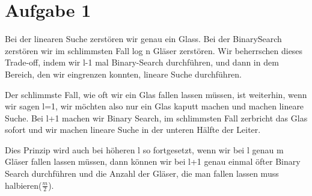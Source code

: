 \documentclass{scrartcl}
\begin{document}
 \section{Aufgabe 1} Bei der linearen Suche 
zerstören wir genau ein Glass. Bei der BinarySearch zerstören wir 
im schlimmsten Fall log n Gläser zerstören. Wir beherrschen dieses 
Trade-off, indem wir l-1 mal Binary-Search durchführen, und dann 
in dem Bereich, den wir eingrenzen konnten, lineare Suche 
durchführen. 

Der schlimmste Fall, wie oft wir ein Glas fallen lassen müssen, 
ist weiterhin, wenn wir sagen l=1, wir möchten also nur ein Glas 
kaputt machen und machen lineare Suche. Bei l+1 machen wir Binary 
Search, im schlimmsten Fall zerbricht das Glas sofort und wir 
machen lineare Suche in der unteren Hälfte der Leiter. 

Dies Prinzip wird auch bei höheren l so fortgesetzt, wenn wir bei 
l genau m Gläser fallen lassen müssen, dann können wir bei l+1 
genau einmal öfter Binary Search durchführen und die Anzahl der 
Gläser, die man fallen lassen muss halbieren($\frac{m}{2}$).
\end{document}
